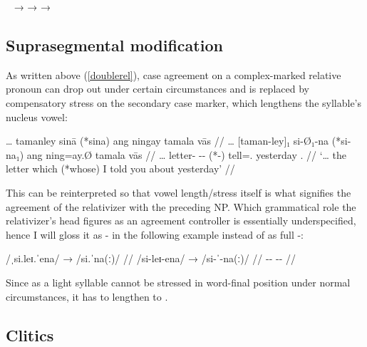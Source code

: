 \pex~\label{ex:adjredup}
	\a {}
		→ 
	\a {}
		→ 
	\a {}
		→ 
\xe


\subsection{Suprasegmental modification}

As written above (\autoref{doublerel}), case agreement on a complex-marked 
relative pronoun can drop out under certain 
circumstances and is replaced by compensatory stress on the secondary case 
marker, which lengthens the syllable's nucleus vowel:

\ex\begingl
	\gla … tamanley sinā {\normalfont (}*sina{\normalfont )} ang ningay tamala
		vās //
	\glb … [taman-ley]₁ si-Ø₁-na (*si-na₁) ang ning=ay.Ø tamala vās //
	\glc … letter-\PargI{} \Rel{}-\PatTI{}-\Gen{} (*\Rel{}-\Gen{}) \AgtT{} 
		tell=\Fsg{}.\Top{} yesterday \Ssg{}.\Parg{} //
	\glft `… the letter which (*whose) I told you about yesterday' //
\endgl\xe

This can be reinterpreted so that vowel length/stress itself is what signifies 
the agreement of the relativizer with the preceding NP. Which grammatical role 
the relativizer's head figures as an agreement controller is essentially 
underspecified, hence I will gloss it as -\Agr{} in the following example 
instead of as full -\PargI{}:

\ex[everygla=\upshape]\begingl
	\gla /ˌsi.leɪ.ˈena/ → /si.ˈna(ː)/ //
	\glb /si-leɪ-ena/ → /si-ˈ-na(ː)/ //
	\glc \Rel{}-\PargI{}-\Gen{} {} \Rel{}-\Agr{}-\Gen{} //
\endgl\xe

Since  as a light syllable cannot be stressed in word-final 
position under normal circumstances, it has to lengthen to .


\subsection{Clitics}
\label{subsec:clitics}

